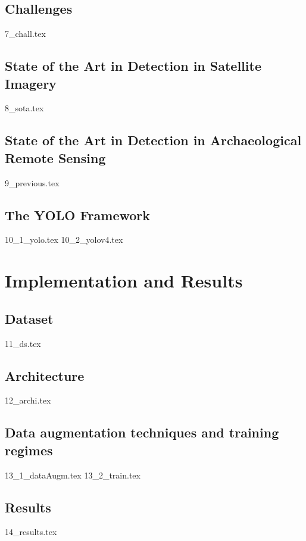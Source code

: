 \documentclass[a4paper, 12pt, titlepage, oneside]{report}
\begin{document}
\chapter{Challenges}\label{challenges}
{7_chall.tex}
\newpage

\chapter[State of the Art]{State of the Art in Detection in Satellite Imagery}\label{sota}
{8_sota.tex}
\newpage

\chapter[State of the Art]{State of the Art in Detection in Archaeological Remote Sensing}
{9_previous.tex}
\newpage

\chapter{The YOLO Framework}\label{yolo}
{10_1_yolo.tex}
{10_2_yolov4.tex}\label{yolov4}
\newpage


\part{Implementation and Results}
\chapter{Dataset}\label{dataset}
{11_ds.tex}
\newpage

\chapter{Architecture}
{12_archi.tex}
\newpage

\chapter[Training]{Data augmentation techniques and training regimes}\label{train}
{13_1_dataAugm.tex}
{13_2_train.tex}
\newpage

\chapter{Results}
{14_results.tex}
\newpage
\end{document}

